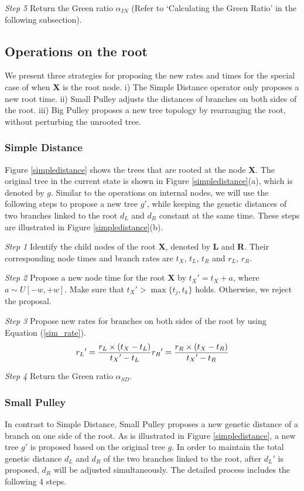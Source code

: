 \documentclass{bmcart}
\begin{document}
\emph{Step 5} Return the Green ratio ${\alpha_{IN}}$ (Refer to `Calculating the Green Ratio' in the following subsection).
\subsection*{Operations on the root}
We present three strategies for proposing the new rates and times for the special case of when \textbf{X} is the root node. i) The Simple Distance operator only proposes a new root time. ii) Small Pulley adjusts the distances of branches on both sides of the root. iii) Big Pulley proposes a new tree topology by rearranging the root, without perturbing the unrooted tree.
\subsubsection*{Simple Distance}
Figure \ref{simpledistance} shows the trees that are rooted at the node \textbf{X}. The original tree in the current state is shown in Figure \ref{simpledistance}(a), which is denoted by $g$. Similar to the operations on internal nodes, we will use the following steps to propose a new tree ${g}'$, while keeping the genetic distances of two branches linked to the root $d_L$ and $d_R$ constant at the same time. These steps are illustrated in Figure \ref{simpledistance}(b).

\emph{Step 1} Identify the child nodes of the root \textbf{X}, denoted by \textbf{L} and \textbf{R}. Their corresponding node times and branch rates are $t_X$, $t_L$, $t_R$ and $r_L$, $r_R$.

\emph{Step 2} Propose a new node time for the root \textbf{X} by ${t_X}' = {t_X} + a$, where $a \sim U[ - w, + w]$. Make sure that ${t_X}' > \max \{ {t_j},{t_k}\} $ holds. Otherwise, we reject the proposal. 

\emph{Step 3} Propose new rates for branches on both sides of the root by using Equation (\ref{sim_rate}).
\begin{equation}
\label{sim_rate}
{r_L}' = \frac{{{r_L} \times ({{t_X} - {t_L}})}}{{{t_X}' - {t_L}}}\\
{r_R}' = \frac{{{r_R} \times ({{t_X} - {t_R}})}}{{{t_X}' - {t_R}}}
 \end{equation}

\emph{Step 4} Return the Green ratio ${\alpha_{SD}}$.
\subsubsection*{Small Pulley}
In contrast to Simple Distance, Small Pulley proposes a new genetic distance of a branch on one side of the root. As is illustrated in Figure \ref{simpledistance}, a new tree ${g}'$ is proposed based on the original tree $g$. In order to maintain the total genetic distance $d_L$ and $d_R$ of the two branches linked to the root, after ${d_L}'$ is proposed, $d_R$ will be adjusted simultaneously. The detailed process includes the following 4 steps.
\end{document}
